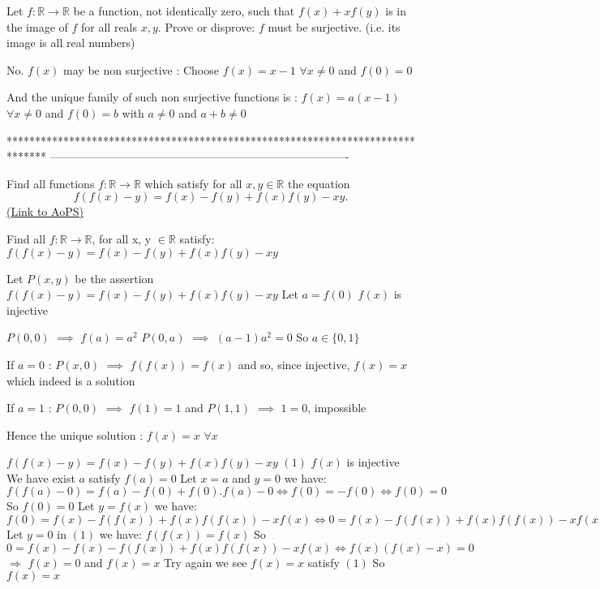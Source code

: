 \begin{solution}
	\begin{tcolorbox}Let $f : \mathbb R \to \mathbb R$ be a function, not identically zero, such that $f(x) + xf(y)$ is in the image of $f$ for all reals $x,y$. Prove or disprove: $f$ must be surjective. (i.e. its image is all real numbers)\end{tcolorbox}
No. $f(x)$ may be non surjective : Choose $f(x)=x-1$ $\forall x\ne 0$ and $f(0)=0$

And the unique family of such non surjective functions is :
$f(x)=a(x-1)$ $\forall x\ne 0$ and $f(0)=b$ with $a\ne 0$ and $a+b\ne 0$
\end{solution}
*******************************************************************************
-------------------------------------------------------------------------------

\begin{problem}
	Find all functions $f:\mathbb{R}\rightarrow \mathbb{R}$ which satisfy for all $x, y \in \mathbb{R}$ the equation
\[f(f(x)-y)=f(x)-f(y)+f(x)f(y)-xy.\]
	\flushright \href{https://artofproblemsolving.com/community/c6h447716}{(Link to AoPS)}
\end{problem}



\begin{solution}
	\begin{tcolorbox}Find all $f:\mathbb{R}\rightarrow \mathbb{R}$,  for all x, y $\in \mathbb{R}$ satisfy:
$f(f(x)-y)=f(x)-f(y)+f(x)f(y)-xy$\end{tcolorbox}
Let $P(x,y)$ be the assertion $f(f(x)-y)=f(x)-f(y)+f(x)f(y)-xy$
Let $a=f(0)$
$f(x)$ is injective

$P(0,0)$ $\implies$ $f(a)=a^2$
$P(0,a)$ $\implies$ $(a-1)a^2=0$
So $a\in\{0,1\}$

If $a=0$ : $P(x,0)$ $\implies$ $f(f(x))=f(x)$ and so, since injective, $f(x)=x$ which indeed is a solution

If $a=1$ : $P(0,0)$ $\implies$ $f(1)=1$ and $P(1,1)$ $\implies$ $1=0$, impossible

Hence the unique solution : $\boxed{f(x)=x}$ $\forall x$
\end{solution}



\begin{solution}
	$ f(f(x)-y)=f(x)-f(y)+f(x)f(y)-xy $ $(1)$
$f(x)$ is injective
We have exist $a$ satisfy $f(a)=0$
Let $x=a$ and $y=0$ we have:
$f(f(a)-0)=f(a)-f(0)+f(0).f(a)-0
\Leftrightarrow f(0)=-f(0)
\Leftrightarrow f(0)=0$
So $f(0)=0$
Let $y=f(x)$ we have:
$f(0)=f(x)-f(f(x))+f(x)f(f(x))-xf(x)
\Leftrightarrow0=f(x)-f(f(x))+f(x)f(f(x))-xf(x)$
Let $y=0$ in $(1)$ we have:
$f(f(x))=f(x)$
So $0=f(x)-f(x)-f(f(x))+f(x)f(f(x))-xf(x)
\Leftrightarrow  f(x)(f(x)-x)=0$
$\Rightarrow $
$f(x)=0$ and $f(x)=x$
Try again we see $f(x)=x$ satisfy $(1)$
So $f(x)=x$
\end{solution}



